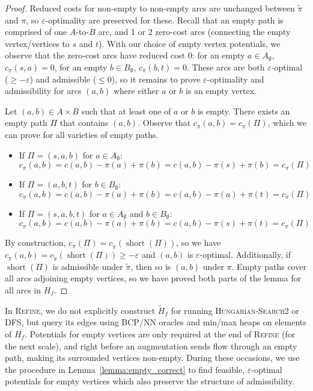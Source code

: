 \documentclass[11pt]{article}
\def\eps{\varepsilon}
\theoremstyle{plain}
\numberwithin{figure}{section}
\def\short{\operatorname{short}}
\begin{document}
\begin{proof}
Reduced costs for non-empty to non-empty arcs are unchanged between
$\tilde{\pi}$ and $\pi$, so $\eps$-optimality are preserved for these.
Recall that an empty path is comprised of one $A$-to-$B$ arc, and 1 or 2
zero-cost arcs (connecting the empty vertex/vertices to $s$ and $t$).
With our choice of empty vertex potentials, we observe that the zero-cost arcs
have reduced cost 0:
for an empty $a \in A_\emptyset$, $c_\pi(s, a) = 0$, for an empty
$b \in B_\emptyset$, $c_\pi(b, t) = 0$.
These arcs are both $\eps$-optimal ($\geq -\eps$) and admissible ($\leq 0$), so
it remains to prove $\eps$-optimality and admissibility for arcs $(a, b)$ where
either $a$ or $b$ is an empty vertex.

Let $(a, b) \in A \times B$ such that at least one of $a$ or $b$ is empty.
There exists an empty path $\Pi$ that contains $(a, b)$.
Observe that $c_\pi(a, b) = c_\pi(\Pi)$,
which we can prove for all varieties of empty paths.
\begin{itemize}
\item If $\Pi = (s, a, b)$ for $a \in A_\emptyset$:
	\begin{equation*}
	c_\pi(a, b) = c(a, b) - \pi(a) + \pi(b) = c(a, b) - \pi(s) + \pi(b) = c_\pi(\Pi)
	\end{equation*}
\item If $\Pi = (a, b, t)$ for $b \in B_\emptyset$:
	\begin{equation*}
	c_\pi(a, b) = c(a, b) - \pi(a) + \pi(b) = c(a, b) - \pi(a) + \pi(t) = c_\pi(\Pi)
	\end{equation*}
\item If $\Pi = (s, a, b, t)$ for $a \in A_\emptyset$ and $b \in B_\emptyset$:
	\begin{equation*}
	c_\pi(a, b) = c(a, b) - \pi(a) + \pi(b) = c(a, b) - \pi(s) + \pi(t) = c_\pi(\Pi)
	\end{equation*}
\end{itemize}
By construction, $c_\pi(\Pi) = c_{\tilde{\pi}}(\short(\Pi))$, so we have
$c_\pi(a, b) = c_{\tilde{\pi}}(\short(\Pi)) \geq -\eps$ and $(a, b)$ is
$\eps$-optimal.
Additionally, if $\short(\Pi)$ is admissible under $\tilde{\pi}$, then so is
$(a, b)$ under $\pi$.
Empty paths cover all arcs adjoining empty vertices, so we have proved both
parts of the lemma for all arcs in $H_f$.
\end{proof}

In \textsc{Refine}, we do not explicitly construct $\tilde{H}_f$ for running
\textsc{Hungarian-Search2} or \textsc{DFS}, but query its edges using BCP/NN
oracles and min/max heaps on elements of $H_f$.
Potentials for empty vertices are only required at the end of \textsc{Refine}
(for the next scale), and right before an augmentation sends flow through an
empty path, making its surrounded vertices non-empty.
During these occasions, we use the procedure in Lemma~\ref{lemma:empty_correct}
to find feasible, $\eps$-optimal potentials for empty vertices which
also preserve the structure of admissibility.
\end{document}
